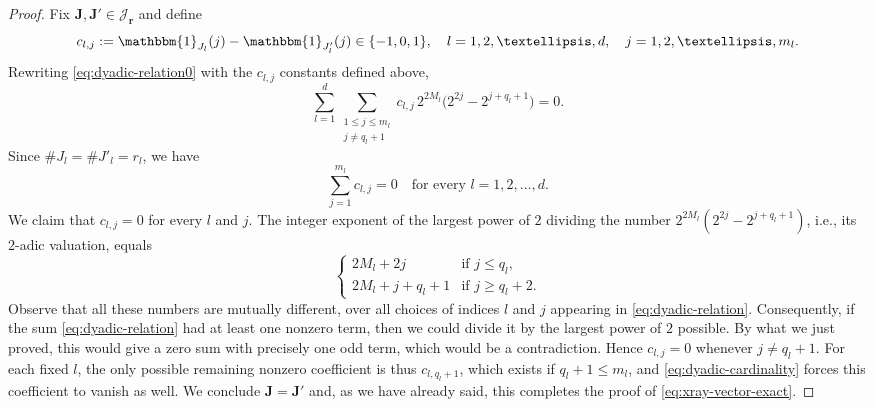 \documentclass[10pt,a4paper]{amsart}
\numberwithin{equation}{section}
\renewcommand{\leq}{\leqslant}
\renewcommand{\ge}{\geqslant}
\begin{document}
\begin{proof}
Fix $\mathbf{J},\mathbf{J}'\in\mathcal{J}_{\mathbf{r}}$ and define
\[ c_{l,j}:=\mathbbm{1}_{J_l}(j)-\mathbbm{1}_{J'_l}(j) \in\{-1,0,1\}, \quad l=1,2,\ldots,d, \quad j=1,2,\ldots,m_l. \]
Rewriting \eqref{eq:dyadic-relation0} with the $c_{l,j}$ constants defined above,
\begin{equation}\label{eq:dyadic-relation}
\sum_{l=1}^d \sum_{\substack{1\leq j\leq m_l\\ j\neq q_l+1}} c_{l,j} \,2^{2M_l} \bigl(2^{2j}-2^{j+q_l+1}\bigr) = 0.
\end{equation}
Since $\#J_l=\#J'_l=r_l$, we have
\begin{equation}\label{eq:dyadic-cardinality}
\sum_{j=1}^{m_l}c_{l,j}=0 \quad\text{for every }l=1,2,\ldots,d.
\end{equation}
We claim that $c_{l,j}=0$ for every $l$ and $j$. The integer exponent of the largest power of $2$ dividing the number $2^{2M_l}(2^{2j}-2^{j+q_l+1})$, i.e., its $2$-adic valuation, equals 
\[ \begin{cases}
2M_l+2j & \text{if } j\leq q_l,\\
2M_l+j+q_l+1 & \text{if } j\ge q_l+2.
\end{cases} \]
Observe that all these numbers are mutually different, over all choices of indices $l$ and $j$ appearing in \eqref{eq:dyadic-relation}. Consequently, if the sum \eqref{eq:dyadic-relation} had at least one nonzero term, then we could divide it by the largest power of $2$ possible. By what we just proved, this would give a zero sum with precisely one odd term, which would be a contradiction.
Hence $c_{l,j}=0$ whenever $j\neq q_l+1$. For each fixed $l$, the only possible remaining nonzero coefficient is thus $c_{l,q_l+1}$, which exists if $q_l+1\leq m_l$, and \eqref{eq:dyadic-cardinality} forces this coefficient to vanish as well.
We conclude $\mathbf{J}=\mathbf{J}'$ and, as we have already said, this completes the proof of \eqref{eq:xray-vector-exact}.


\end{proof}
\end{document}

